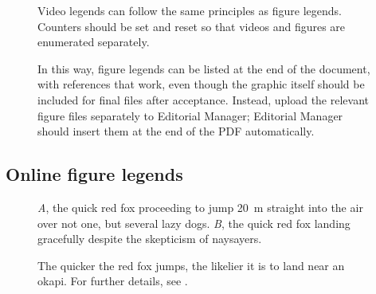 \documentclass[11pt]{article}
\begin{document}


\renewcommand{\figurename}{Video} 
\setcounter{figure}{0}

\begin{figure}[h!]
\caption{Video legends can follow the same principles as figure legends. Counters should be set and reset so that videos and figures are enumerated separately.}
\label{VideoExample}
\end{figure}

\renewcommand{\figurename}{Figure}
\setcounter{figure}{1}



\begin{figure}[h!]
\caption{In this way, figure legends can be listed at the end of the document, with references that work, even though the graphic itself should be included for final files after acceptance. Instead, upload the relevant figure files separately to Editorial Manager; Editorial Manager should insert them at the end of the PDF automatically.}
\label{Fig:AnotherFigure}
\end{figure}

\subsection*{Online figure legends}

\renewcommand{\thefigure}{A\arabic{figure}}
\setcounter{figure}{0}

\begin{figure}[h!]
\caption{\textit{A}, the quick red fox proceeding to jump 20~m straight into the air over not one, but several lazy dogs. \textit{B}, the quick red fox landing gracefully despite the skepticism of naysayers.}
\label{Fig:Jumps}
\end{figure}

\begin{figure}[h!]
\caption{The quicker the red fox jumps, the likelier it is to land near an okapi. For further details, see \citet{LemKapEx07}.}
\label{Fig:JumpsOk}
\end{figure}

\renewcommand{\thefigure}{B\arabic{figure}}
\setcounter{figure}{0}
\end{document}

